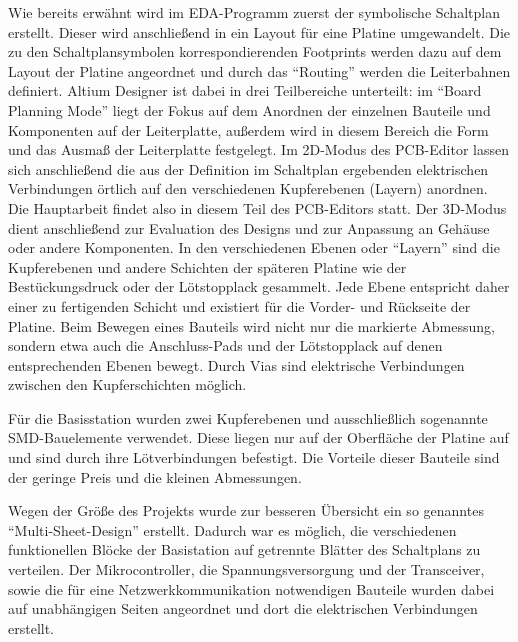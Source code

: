 Wie bereits erwähnt wird im \ac{EDA}-Programm zuerst der symbolische Schaltplan erstellt. Dieser wird anschließend in ein Layout für eine Platine umgewandelt. Die zu den Schaltplansymbolen korrespondierenden Footprints werden dazu auf dem Layout der Platine angeordnet und durch das \enquote{Routing} werden die Leiterbahnen definiert.
Altium Designer ist dabei in drei Teilbereiche unterteilt: im \enquote{Board Planning Mode}  liegt der Fokus auf dem Anordnen der einzelnen Bauteile und Komponenten auf der Leiterplatte, außerdem wird in diesem Bereich die Form und das Ausmaß der Leiterplatte festgelegt. Im 2D-Modus des \ac{PCB}-Editor lassen sich anschließend die aus der Definition im Schaltplan ergebenden elektrischen Verbindungen örtlich auf den verschiedenen Kupferebenen (Layern) anordnen. Die Hauptarbeit findet also in diesem Teil des \ac{PCB}-Editors statt. Der 3D-Modus dient anschließend zur Evaluation des Designs und zur Anpassung an Gehäuse oder andere Komponenten.
In den verschiedenen Ebenen oder \enquote{Layern} sind die Kupferebenen und andere Schichten der späteren Platine wie der Bestückungsdruck oder der Lötstopplack gesammelt. Jede Ebene entspricht daher einer zu fertigenden Schicht und existiert für die Vorder- und Rückseite der Platine. Beim Bewegen eines Bauteils wird nicht nur die markierte Abmessung, sondern etwa auch die Anschluss-Pads und der Lötstopplack auf denen entsprechenden Ebenen bewegt. Durch Vias sind elektrische Verbindungen zwischen den Kupferschichten möglich.

Für die Basisstation wurden zwei Kupferebenen und ausschließlich sogenannte \ac{SMD}-Bauelemente verwendet. Diese liegen nur auf der Oberfläche der Platine auf und sind durch ihre Lötverbindungen befestigt. Die Vorteile dieser Bauteile sind der geringe Preis und die kleinen Abmessungen. 


Wegen der Größe des Projekts wurde zur besseren Übersicht ein  so genanntes \enquote{Multi-Sheet-Design} erstellt. Dadurch war es möglich, die verschiedenen funktionellen Blöcke der Basistation auf getrennte Blätter des Schaltplans zu verteilen. Der Mikrocontroller, die Spannungsversorgung und der Transceiver, sowie die für eine Netzwerkkommunikation notwendigen Bauteile  wurden dabei auf unabhängigen Seiten angeordnet und dort die elektrischen Verbindungen erstellt.

